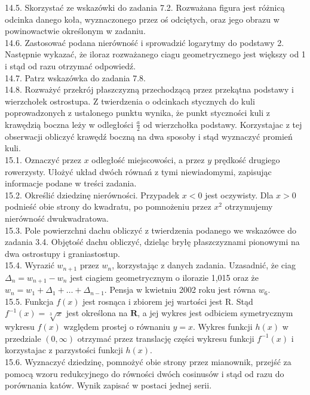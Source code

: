\documentclass[10pt]{article}
\begin{document}
14.5. Skorzystać ze wskazówki do zadania 7.2. Rozważana figura jest różnicą odcinka danego koła, wyznaczonego przez oś odciętych, oraz jego obrazu w powinowactwie określonym w zadaniu.\\
14.6. Zastosować podana nierówność i sprowadzić logarytmy do podstawy 2. Następnie wykazać, że iloraz rozważanego ciagu geometrycznego jest większy od 1 i stąd od razu otrzymać odpowiedź.\\
14.7. Patrz wskazówka do zadania 7.8.\\
14.8. Rozważyć przekrój płaszczyzną przechodzącą przez przekątna podstawy i wierzchołek ostrostupa. Z twierdzenia o odcinkach stycznych do kuli poprowadzonych z ustalonego punktu wynika, że punkt styczności kuli z krawędzią boczna leży w odległości $\frac{a}{2}$ od wierzchołka podstawy. Korzystajac z tej obserwacji obliczyć krawędź boczną na dwa sposoby i stąd wyznaczyć promień kuli.\\
15.1. Oznaczyć przez $x$ odległość miejscowości, a przez $y$ prędkość drugiego rowerzysty. Ułożyć układ dwóch równań z tymi niewiadomymi, zapisując informacje podane w treści zadania.\\
15.2. Określić dziedzinę nierówności. Przypadek $x<0$ jest oczywisty. Dla $x>0$ podnieść obie strony do kwadratu, po pomnożeniu przez $x^{2}$ otrzymujemy nierówność dwukwadratowa.\\
15.3. Pole powierzchni dachu obliczyć z twierdzenia podanego we wskazówce do zadania 3.4. Objętość dachu obliczyć, dzieląc bryłę płaszczyznami pionowymi na dwa ostrostupy i graniastostup.\\
15.4. Wyrazić $w_{n+1}$ przez $w_{n}$, korzystając z danych zadania. Uzasadnić, że ciag $\Delta_{n}=w_{n+1}-w_{n}$ jest ciagiem geometrycznym o ilorazie 1,015 oraz że $w_{n}=w_{1}+\Delta_{1}+\ldots+\Delta_{n-1}$. Pensja w kwietniu 2002 roku jest równa $w_{6}$.\\
15.5. Funkcja $f(x)$ jest rosnąca i zbiorem jej wartości jest R. Stąd $f^{-1}(x)=\sqrt[3]{x}$ jest określona na $\mathbf{R}$, a jej wykres jest odbiciem symetrycznym wykresu $f(x)$ względem prostej o równaniu $y=x$. Wykres funkcji $h(x)$ w przedziale $(0, \infty)$ otrzymać przez translację części wykresu funkcji $f^{-1}(x)$ i korzystajac z parzystości funkcji $h(x)$.\\
15.6. Wyznaczyć dziedzinę, pomnożyć obie strony przez mianownik, przejść za pomocą wzoru redukcyjnego do równości dwóch cosinusów i stąd od razu do porównania katów. Wynik zapisać w postaci jednej serii.\\
\end{document}
